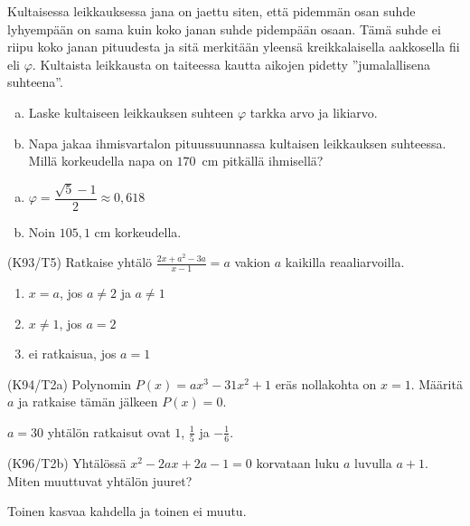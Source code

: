 \begin{tehtavasivu}
\begin{tehtava}
    Kultaisessa leikkauksessa jana on jaettu siten, että pidemmän osan suhde lyhyempään on sama kuin koko janan suhde pidempään osaan. Tämä suhde ei riipu koko janan pituudesta ja sitä merkitään yleensä kreikkalaisella aakkosella fii eli $\varphi$. Kultaista leikkausta on taiteessa kautta aikojen pidetty ''jumalallisena suhteena''.
		\begin{enumerate}[a)]
            \item Laske kultaiseen leikkauksen suhteen $\varphi$ tarkka arvo ja likiarvo.
            \item Napa jakaa ihmisvartalon pituussuunnassa kultaisen leikkauksen suhteessa. Millä korkeudella napa on $170$~cm pitkällä ihmisellä?
        \end{enumerate}
    \begin{vastaus}
        \begin{enumerate}[a)]
            \item $ \varphi = \dfrac{\sqrt{5}-1}{2} \approx 0,618$
            \item Noin $105,1$ cm korkeudella.
        \end{enumerate}
    \end{vastaus}
\end{tehtava}

\begin{tehtava}
(K93/T5) Ratkaise yhtälö
        $\frac{2x+a^2-3a}{x-1}=a$ vakion $a$ kaikilla reaaliarvoilla.
\begin{vastaus}
        \begin{enumerate}
         \item{$x=a$, jos $a \neq 2$ ja $a \neq 1$}
         \item{$x\neq 1$, jos $a=2$}
         \item{ei ratkaisua, jos $a=1$}
        \end{enumerate}
    \end{vastaus}
\end{tehtava}

\begin{tehtava}
(K94/T2a) Polynomin $P(x)=ax^3-31x^2+1$ eräs nollakohta on $x=1$. Määritä $a$ ja ratkaise tämän jälkeen $P(x)=0$.
\begin{vastaus}
      $a=30$ yhtälön ratkaisut ovat $1$, $\frac{1}{5}$ ja $-\frac{1}{6}$.
    \end{vastaus}
\end{tehtava}

\begin{tehtava}
(K96/T2b) Yhtälössä $x^2-2ax+2a-1=0$ korvataan luku $a$ luvulla $a+1$. Miten muuttuvat yhtälön juuret?
\begin{vastaus}
     Toinen kasvaa kahdella ja toinen ei muutu.
    \end{vastaus}
\end{tehtava}


\end{tehtavasivu}
